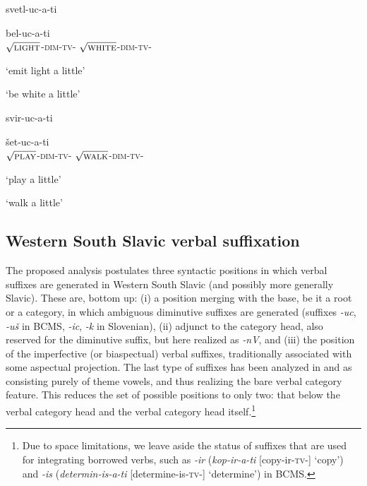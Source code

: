 \documentclass[output=paper,colorlinks,citecolor=brown]{langscibook}
\begin{document}
\ea\label{str:ex:kraj}
 
\gll \parbox{3.5cm}{svetl-uc-a-ti}	bel-uc-a-ti\\
$\sqrt{\textsc{light}}$-\textsc{dim-tv}-{\INF} $\sqrt{\textsc{white}}$-\textsc{dim-tv}-{\INF}\\ 
\glt \parbox{3.5cm}{`emit light a little'} `be white a little'

\gll \parbox{3.5cm}{svir-uc-a-ti} šet-uc-a-ti\\
 $\sqrt{\textsc{play}}$-\textsc{dim-tv}-{\INF} $\sqrt{\textsc{walk}}$-\textsc{dim-tv}-{\INF}\\ 
\glt \parbox{3.5cm}{`play a little'} `walk a little' 

\z

 



\subsection{Western South Slavic verbal suffixation} \label{str:subsect:How_does_nV_analyzed_in_this_way_fit_the_broader_picture}

The proposed analysis postulates three syntactic positions in which verbal suffixes are generated in Western South Slavic (and possibly more generally Slavic). These are, bottom up: (i) a position merging with the base, be it a root or a category, in which ambiguous diminutive suffixes are generated (suffixes \textit{-uc}, \textit{-uš} in BCMS, \textit{-ic}, \textit{-k} in Slovenian), (ii) adjunct to the category head, also reserved for the diminutive suffix, but here realized as \textit{-nV}, and (iii) the position of the imperfective (or biaspectual) verbal suffixes, traditionally associated with some aspectual projection. The last type of suffixes has been analyzed in \citet{SimonovicEtAl2021} and \citet{ArsenijevicEtAl2023} as consisting purely of theme vowels, and thus realizing the bare verbal category feature. This reduces the set of possible positions to only two: that below the verbal category head and the verbal category head itself.\footnote{Due to space limitations, we leave aside the status of suffixes that are used for integrating borrowed verbs, such as \textit{-ir} (\textit{kop-ir-a-ti} [copy-ir-\textsc{tv}-{\INF}] `copy') and \textit{-is} (\textit{determin-is-a-ti} [determine-is-\textsc{tv}-{\INF}] `determine') in BCMS.}
\end{document}

